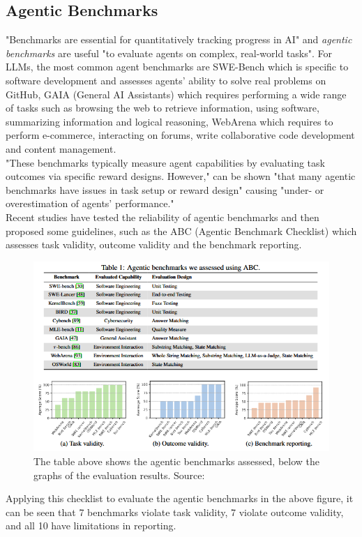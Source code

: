 \documentclass[12pt]{article}
\begin{document}
	\subsection{Agentic Benchmarks}
	"Benchmarks are essential for quantitatively tracking progress in AI" and \textit{agentic benchmarks} are useful "to evaluate agents on complex, real-world tasks"\cite{zhu2025establishingbestpracticesbuilding}. For LLMs, the most common agent benchmarks are SWE-Bench which is specific to software development and assesses agents' ability to solve real problems on GitHub, GAIA (General AI Assistants) which requires performing a wide range of tasks such as browsing the web to retrieve information, using software, summarizing information and logical reasoning, WebArena which requires to perform e-commerce, interacting on forums, write collaborative code development and content management.\\
	"These benchmarks typically measure agent capabilities by evaluating task outcomes via specific reward
designs. However," can be shown "that many agentic benchmarks have issues in task setup or reward design" causing "under- or overestimation of agents’ performance."\cite{zhu2025establishingbestpracticesbuilding}\\
Recent studies have tested the reliability of agentic benchmarks and then proposed some guidelines, such as the ABC (Agentic Benchmark Checklist) which assesses task validity, outcome validity and the benchmark reporting.\\
\begin{figure}[H]
    \centering
            \includegraphics[width=1\textwidth]{AgenticBenchmarksAssessment.png}
    \caption[Assessing of agentic benchmarks]{The table above shows the agentic benchmarks assessed, below the graphs of the evaluation results. Source: \cite{zhu2025establishingbestpracticesbuilding}}
    \end{figure}
Applying this checklist to evaluate the agentic benchmarks in the above figure, it can be seen that 7 benchmarks violate task validity, 7 violate outcome validity, and all 10 have limitations in reporting.\cite{zhu2025establishingbestpracticesbuilding}\\
\end{document}
